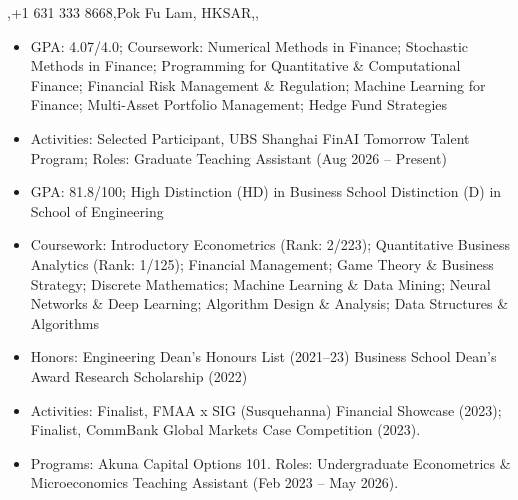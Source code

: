 \documentclass{article}
\begin{document}
  {\sep +1 631 333 8668\sep Pok Fu Lam, HKSAR\sep \linkedin\sep \github}
\cvheaderend

\begin{itemize}
  \item GPA: 4.07/4.0; Coursework: Numerical Methods in Finance; Stochastic Methods in Finance; Programming for Quantitative \& Computational Finance; Financial Risk Management \& Regulation; Machine Learning for Finance; Multi-Asset Portfolio Management; Hedge Fund Strategies
  \item Activities: Selected Participant, UBS Shanghai FinAI Tomorrow Talent Program; Roles: Graduate Teaching Assistant (Aug 2026 -- Present)
\end{itemize}
\entrygap
{}
\begin{itemize}
  \item GPA: 81.8/100; High Distinction (HD) in Business School \textbar{} Distinction (D) in School of Engineering
  \item Coursework: Introductory Econometrics (Rank: 2/223); Quantitative Business Analytics (Rank: 1/125); Financial Management; Game Theory \& Business Strategy; Discrete Mathematics; Machine Learning \& Data Mining; Neural Networks \& Deep Learning; Algorithm Design \& Analysis; Data Structures \& Algorithms
  \item Honors: Engineering Dean's Honours List (2021--23) \textbar{} Business School Dean's Award \textbar{} Research Scholarship (2022)
  \item Activities: Finalist, FMAA x SIG (Susquehanna) Financial Showcase (2023); Finalist, CommBank Global Markets Case Competition (2023).
  \item Programs: Akuna Capital Options 101. Roles: Undergraduate Econometrics \& Microeconomics Teaching Assistant (Feb 2023 -- May 2026).
\end{itemize}
\end{document}
